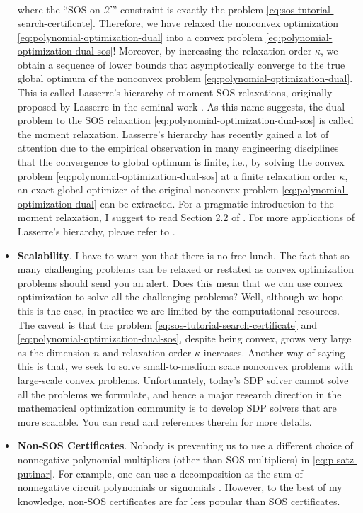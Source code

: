 \documentclass[
]{book}
\theoremstyle{definition}
\theoremstyle{definition}
\theoremstyle{definition}
\theoremstyle{definition}
\theoremstyle{remark}
\begin{document}
\begin{itemize}
\begin{equation}
\begin{split}
  \end{split}
  \label{eq:polynomial-optimization-dual-sos}
  \end{equation}
  where the ``SOS on \(\mathcal{X}\)'' constraint is exactly the problem \eqref{eq:sos-tutorial-search-certificate}. Therefore, we have relaxed the nonconvex optimization \eqref{eq:polynomial-optimization-dual} into a convex problem \eqref{eq:polynomial-optimization-dual-sos}! Moreover, by increasing the relaxation order \(\kappa\), we obtain a sequence of lower bounds that asymptotically converge to the true global optimum of the nonconvex problem \eqref{eq:polynomial-optimization-dual}. This is called Lasserre's hierarchy of moment-SOS relaxations, originally proposed by Lasserre in the seminal work \citep{lasserre01siopt-global}. As this name suggests, the dual problem to the SOS relaxation \eqref{eq:polynomial-optimization-dual-sos} is called the moment relaxation. Lasserre's hierarchy has recently gained a lot of attention due to the empirical observation in many engineering disciplines that the convergence to global optimum is finite, i.e., by solving the convex problem \eqref{eq:polynomial-optimization-dual-sos} at a finite relaxation order \(\kappa\), an exact global optimizer of the original nonconvex problem \eqref{eq:polynomial-optimization-dual} can be extracted. For a pragmatic introduction to the moment relaxation, I suggest to read Section 2.2 of \citep{yang22pami-certifiably}. For more applications of Lasserre's hierarchy, please refer to \citep{lasserre09book-moments}.
\item
  \textbf{Scalability}. I have to warn you that there is no free lunch. The fact that so many challenging problems can be relaxed or restated as convex optimization problems should send you an alert. Does this mean that we can use convex optimization to solve all the challenging problems? Well, although we hope this is the case, in practice we are limited by the computational resources. The caveat is that the problem \eqref{eq:sos-tutorial-search-certificate} and \eqref{eq:polynomial-optimization-dual-sos}, despite being convex, grows very large as the dimension \(n\) and relaxation order \(\kappa\) increases. Another way of saying this is that, we seek to solve small-to-medium scale nonconvex problems with large-scale convex problems. Unfortunately, today's SDP solver cannot solve all the problems we formulate, and hence a major research direction in the mathematical optimization community is to develop SDP solvers that are more scalable. You can read \citep{yang22mp-inexact} and references therein for more details.
\item
  \textbf{Non-SOS Certificates}. Nobody is preventing us to use a different choice of nonnegative polynomial multipliers (other than SOS multipliers) in \eqref{eq:p-satz-putinar}. For example, one can use a decomposition as the sum of nonnegative circuit polynomials \citep{wang22-nonnegative} or signomials \citep{murray21mpc-signomial}. However, to the best of my knowledge, non-SOS certificates are far less popular than SOS certificates.
\end{itemize}
\end{document}
